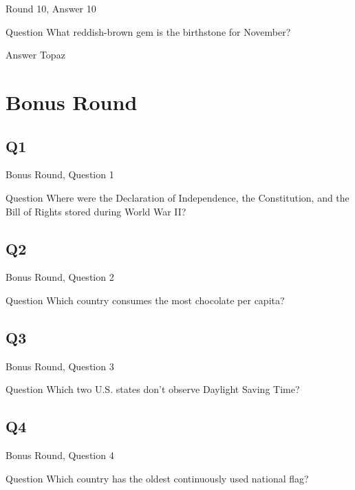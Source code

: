 \documentclass[11pt]{beamer}
\begin{document}
\begin{frame}[t]{Round 10, Answer 10}
\vspace{2em}
\begin{block}{Question}
What reddish-brown gem is the birthstone for November\@?
\end{block}
\pause{}
\begin{block}{Answer}
Topaz
\end{block}
\end{frame}
    

\section{Bonus Round}
    

\subsection*{Q1}
\begin{frame}[t]{Bonus Round, Question 1}
\vspace{2em}
\begin{block}{Question}
Where were the Declaration of Independence, the Constitution, and the Bill of Rights stored during World War II\@?
\end{block}
\end{frame}
    

\subsection*{Q2}
\begin{frame}[t]{Bonus Round, Question 2}
\vspace{2em}
\begin{block}{Question}
Which country consumes the most chocolate per capita\@?
\end{block}
\end{frame}
    

\subsection*{Q3}
\begin{frame}[t]{Bonus Round, Question 3}
\vspace{2em}
\begin{block}{Question}
Which two U.S. states don't observe Daylight Saving Time\@?
\end{block}
\end{frame}
    

\subsection*{Q4}
\begin{frame}[t]{Bonus Round, Question 4}
\vspace{2em}
\begin{block}{Question}
Which country has the oldest continuously used national flag\@?
\end{block}
\end{frame}
    
\end{document}
